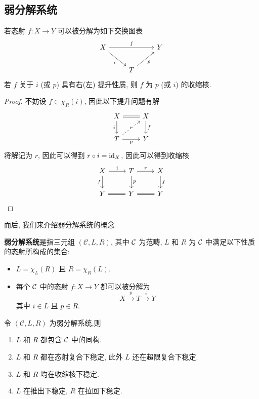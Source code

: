 \subsection{弱分解系统}\label{弱分解系统}

\begin{lemma}[收缩核论证]
    若态射 $f: X \to Y$ 可以被分解为如下交换图表
    \[\begin{tikzcd}
	X && Y \\
	& T
	\arrow["f", from=1-1, to=1-3]
	\arrow["i"', from=1-1, to=2-2]
	\arrow["p"', from=2-2, to=1-3]
    \end{tikzcd}\]
    若 $f$ 关于 $i$ (或 $p$) 具有右(左) 提升性质, 则 $f$ 为 $p$ (或 $i$) 的收缩核.
\end{lemma}
\begin{proof}
    不妨设 $f\in \chi_R(i)$, 因此以下提升问题有解
    \[\begin{tikzcd}
	X & X \\
	T & Y
	\arrow[equal, from=1-1, to=1-2]
	\arrow["i"', from=1-1, to=2-1]
	\arrow["f", from=1-2, to=2-2]
	\arrow["r"{description}, dashed, from=2-1, to=1-2]
	\arrow["p"', from=2-1, to=2-2]
    \end{tikzcd}\]
    将解记为 $r$, 因此可以得到 $r\circ i = \mathrm{id}_X$, 因此可以得到收缩核
    \[\begin{tikzcd}
	X & T & X \\
	Y & Y & Y
	\arrow["i", from=1-1, to=1-2]
	\arrow["f"', from=1-1, to=2-1]
	\arrow["r", from=1-2, to=1-3]
	\arrow["p", from=1-2, to=2-2]
	\arrow["f", from=1-3, to=2-3]
	\arrow[equal, from=2-1, to=2-2]
	\arrow[equal, from=2-2, to=2-3]
    \end{tikzcd}\]
\end{proof}
而后, 我们来介绍弱分解系统的概念
\begin{definition}[弱分解系统]
    \textbf{弱分解系统}是指三元组 $(\mathcal{C},L,R)$, 其中 $\cal{C}$ 为范畴, $L$ 和 $R$ 为 $\cal{C}$ 中满足以下性质的态射所构成的集合:
    \begin{itemize}
        \item $L = \chi_L(R)$ 且 $R= \chi_R(L)$.
        \item  每个 $\cal{C}$ 中的态射 $f:X \to Y$ 都可以被分解为 
        \[
        X\xrightarrow{p}T\xrightarrow{i}Y
        \]
        其中 $i\in L$ 且 $p\in R$.
    \end{itemize}
\end{definition}
\begin{proposition}
    令 $(\mathcal{C},L,R)$ 为弱分解系统,则
    \begin{enumerate}
        \item $L$ 和 $R$ 都包含 $\cal{C}$ 中的同构.
        \item $L$ 和 $R$ 都在态射复合下稳定, 此外 $L$ 还在超限复合下稳定.
        \item $L$ 和 $R$ 均在收缩核下稳定.
        \item $L$ 在推出下稳定, $R$ 在拉回下稳定.
    \end{enumerate}
\end{proposition}
